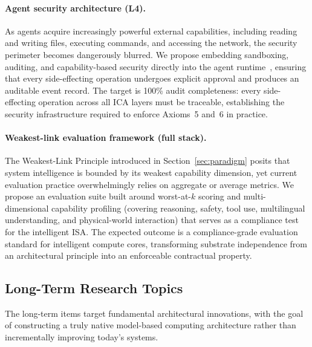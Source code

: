 \paragraph{Agent security architecture (L4).}
As agents acquire increasingly powerful external capabilities, including reading and writing files, executing commands, and accessing the network, the security perimeter becomes dangerously blurred.
We propose embedding sandboxing, auditing, and capability-based security directly into the agent runtime~\cite{debenedetti2025camel,ironclaw2025,agenticsecurity2025}, ensuring that every side-effecting operation undergoes explicit approval and produces an auditable event record.
The target is 100\% audit completeness: every side-effecting operation across all ICA layers must be traceable, establishing the security infrastructure required to enforce Axioms~5 and~6 in practice.

\paragraph{Weakest-link evaluation framework (full stack).}
The Weakest-Link Principle introduced in Section~\ref{sec:paradigm} posits that system intelligence is bounded by its weakest capability dimension, yet current evaluation practice overwhelmingly relies on aggregate or average metrics.
We propose an evaluation suite built around worst-at-$k$ scoring and multi-dimensional capability profiling (covering reasoning, safety, tool use, multilingual understanding, and physical-world interaction) that serves as a compliance test for the intelligent ISA.
The expected outcome is a compliance-grade evaluation standard for intelligent compute cores, transforming substrate independence from an architectural principle into an enforceable contractual property.

\subsection{Long-Term Research Topics}

The long-term items target fundamental architectural innovations, with the goal of constructing a truly native model-based computing architecture rather than incrementally improving today's systems.

